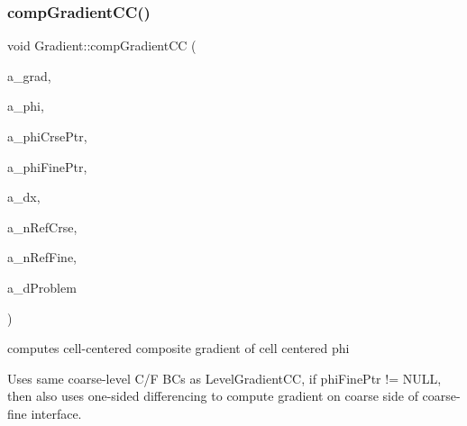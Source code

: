 \subsubsection{\texorpdfstring{comp\+Gradient\+C\+C()}{compGradientCC()}\hspace{0.1cm}{\footnotesize\ttfamily [1/6]}}
{\footnotesize\ttfamily void Gradient\+::comp\+Gradient\+CC (\begin{DoxyParamCaption}\item[{\textbf{ Level\+Data}$<$ \textbf{ F\+Array\+Box} $>$ \&}]{a\+\_\+grad,  }\item[{\textbf{ Level\+Data}$<$ \textbf{ F\+Array\+Box} $>$ \&}]{a\+\_\+phi,  }\item[{const \textbf{ Level\+Data}$<$ \textbf{ F\+Array\+Box} $>$ $\ast$}]{a\+\_\+phi\+Crse\+Ptr,  }\item[{const \textbf{ Level\+Data}$<$ \textbf{ F\+Array\+Box} $>$ $\ast$}]{a\+\_\+phi\+Fine\+Ptr,  }\item[{const \textbf{ Real}}]{a\+\_\+dx,  }\item[{const int}]{a\+\_\+n\+Ref\+Crse,  }\item[{const int}]{a\+\_\+n\+Ref\+Fine,  }\item[{const \textbf{ Problem\+Domain} \&}]{a\+\_\+d\+Problem }\end{DoxyParamCaption})\hspace{0.3cm}{\ttfamily [static]}}



computes cell-\/centered composite gradient of cell centered phi 

Uses same coarse-\/level C/F BC\textquotesingle{}s as Level\+Gradient\+CC, if phi\+Fine\+Ptr != N\+U\+LL, then also uses one-\/sided differencing to compute gradient on coarse side of coarse-\/fine interface. \mbox{\label{class_gradient_a0a941dcb9ad58ed819f41d4fe1080106}} 
